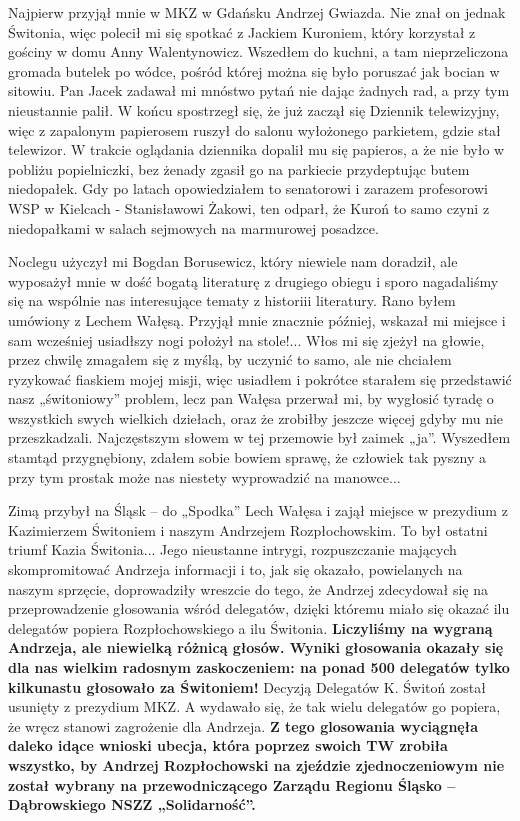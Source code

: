 Najpierw przyjął mnie w MKZ w Gdańsku Andrzej Gwiazda. Nie znał on jednak Świtonia, więc polecił mi się spotkać z Jackiem Kuroniem, który korzystał z gościny w domu Anny Walentynowicz. Wszedłem do kuchni, a tam nieprzeliczona gromada butelek po wódce, pośród której można się było poruszać jak bocian w sitowiu. Pan Jacek zadawał mi mnóstwo pytań nie dając żadnych rad, a przy tym nieustannie palił. W końcu spostrzegł się, że już zaczął się Dziennik telewizyjny, więc z zapalonym papierosem ruszył do salonu wyłożonego parkietem, gdzie stał telewizor. W trakcie oglądania dziennika dopalił mu się papieros, a że nie było w pobliżu popielniczki, bez żenady zgasił go na parkiecie przydeptując butem niedopałek. Gdy po latach opowiedziałem to senatorowi i zarazem profesorowi WSP w Kielcach - Stanisławowi Żakowi, ten odparł, że Kuroń to samo czyni z niedopałkami w salach sejmowych na marmurowej posadzce.

Noclegu użyczył mi Bogdan Borusewicz, który niewiele nam doradził, ale wyposażył  mnie w dość bogatą literaturę z drugiego obiegu i sporo nagadaliśmy się na wspólnie nas interesujące tematy z historiii literatury. Rano byłem umówiony z Lechem Wałęsą. Przyjął mnie znacznie później, wskazał mi miejsce i sam wcześniej usiadłszy  nogi położył na stole!... Włos mi się zjeżył na głowie, przez chwilę zmagałem się z myślą, by uczynić to samo, ale nie chciałem ryzykować fiaskiem mojej misji, więc usiadłem i pokrótce starałem się przedstawić nasz „świtoniowy” problem, lecz pan Wałęsa przerwał mi, by wygłosić tyradę o wszystkich swych wielkich dziełach, oraz że zrobiłby jeszcze więcej gdyby mu nie przeszkadzali. Najczęstszym słowem w tej przemowie był zaimek „ja”. Wyszedłem stamtąd przygnębiony, zdałem sobie bowiem sprawę, że człowiek tak pyszny a przy tym prostak może nas niestety wyprowadzić na manowce...

Zimą przybył na Śląsk – do „Spodka” Lech Wałęsa i zajął miejsce w prezydium z Kazimierzem Świtoniem i naszym Andrzejem Rozpłochowskim. To był ostatni triumf Kazia Świtonia... Jego nieustanne intrygi, rozpuszczanie mających skompromitować Andrzeja informacji i to, jak się okazało, powielanych na naszym sprzęcie, doprowadziły wreszcie do tego, że Andrzej zdecydował się na przeprowadzenie głosowania wśród delegatów, dzięki któremu miało się okazać ilu delegatów popiera Rozpłochowskiego a ilu Świtonia. \textbf{Liczyliśmy na wygraną Andrzeja, ale niewielką różnicą głosów. Wyniki głosowania okazały się dla nas wielkim radosnym zaskoczeniem: na ponad 500 delegatów tylko kilkunastu głosowało za Świtoniem!} Decyzją Delegatów K. Świtoń został usunięty z prezydium MKZ. A wydawało się, że tak wielu delegatów go popiera, że wręcz stanowi zagrożenie dla Andrzeja. \textbf{Z tego glosowania wyciągnęła daleko idące wnioski ubecja, która poprzez swoich TW zrobiła wszystko, by Andrzej Rozpłochowski na zjeździe zjednoczeniowym nie został wybrany na przewodniczącego Zarządu Regionu Śląsko – Dąbrowskiego NSZZ „Solidarność”.}


